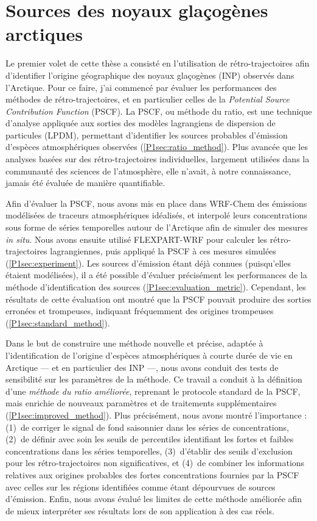\section*{Sources des noyaux glaçogènes arctiques}
Le premier volet de cette thèse a consisté en l'utilisation de rétro-trajectoires afin d’identifier l’origine géographique des noyaux glaçogènes (INP) observés dans l’Arctique. Pour ce faire, j’ai commencé par évaluer les performances des méthodes de rétro-trajectoires, et en particulier celles de la \textit{Potential Source Contribution Function} (PSCF).  
La PSCF, ou méthode du ratio, est une technique d’analyse appliquée aux sorties des modèles lagrangiens de dispersion de particules (LPDM), permettant d’identifier les sources probables d’émission d’espèces atmosphériques observées (\cref{P1sec:ratio_method}).  
Plus avancée que les analyses basées sur des rétro-trajectoires individuelles, largement utilisées dans la communauté des sciences de l’atmosphère, elle n’avait, à notre connaissance, jamais été évaluée de manière quantifiable.  

Afin d’évaluer la PSCF, nous avons mis en place dans WRF-Chem des émissions modélisées de traceurs atmosphériques idéalisés, et interpolé leurs concentrations sous forme de séries temporelles autour de l’Arctique afin de simuler des mesures \textit{in situ}.  
Nous avons ensuite utilisé FLEXPART-WRF pour calculer les rétro-trajectoires lagrangiennes, puis appliqué la PSCF à ces mesures simulées (\cref{P1sec:experiment}).  
Les sources d’émission étant déjà connues (puisqu’elles étaient modélisées), il a été possible d’évaluer précisément les performances de la méthode d’identification des sources (\cref{P1sec:evaluation_metric}).  
Cependant, les résultats de cette évaluation ont montré que la PSCF pouvait produire des sorties erronées et trompeuses, indiquant fréquemment des origines trompeuses (\cref{P1sec:standard_method}).  

Dans le but de construire une méthode nouvelle et précise, adaptée à l’identification de l'origine d'espèces atmosphériques à courte durée de vie en Arctique --- et en particulier des INP ---, nous avons conduit des tests de sensibilité sur les paramètres de la méthode.  
Ce travail a conduit à la définition d’une \textit{méthode du ratio améliorée}, reprenant le protocole standard de la PSCF, mais enrichie de nouveaux paramètres et de traitements supplémentaires (\cref{P1sec:improved_method}).  
Plus précisément, nous avons montré l’importance : (1)~de corriger le signal de fond saisonnier dans les séries de concentrations, (2)~de définir avec soin les seuils de percentiles identifiant les fortes et faibles concentrations dans les séries temporelles, (3)~d’établir des seuils d’exclusion pour les rétro-trajectoires non significatives, et (4)~de combiner les informations relatives aux origines probables des fortes concentrations fournies par la PSCF avec celles sur les régions identifiées comme étant dépourvues de sources d'émission.  
Enfin, nous avons évalué les limites de cette méthode améliorée afin de mieux interpréter ses résultats lors de son application à des cas réels.  
\vspace{\baselineskip}

